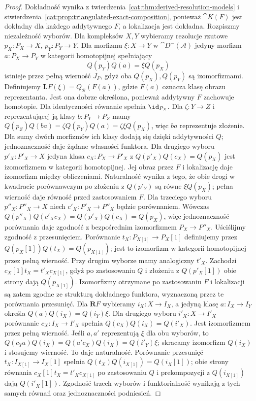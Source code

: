 \begin{proof}
Dokładność wynika z twierdzenia~\ref{cat:thm:derived-resolution-models} i stwierdzenia~\ref{cat:prop:triangulated-exact-composition}, ponieważ $\cat K(F)$ jest dokładny dla każdego addytywnego $F$, a lokalizacja jest dokładna. Rozpiszmy niezależność wyborów. Dla kompleksów $X,Y$ wybieramy rezolucje rzutowe $p_X:P_X\to X$, $p_Y:P_Y\to Y$. Dla morfizmu $\xi:X\to Y$ w $\cat D^-(\mathcal A)$ jedyny morfizm $a:P_X\to P_Y$ w kategorii homotopijnej spełniający
\[
 Q(p_Y)Q(a)=\xi Q(p_X)
\]
istnieje przez pełną wierność $J_P$, gdyż oba $Q(p_X),Q(p_Y)$ są izomorfizmami. Definiujemy $\mathbf L F(\xi)=Q_{\mathcal B}(F(a))$, gdzie $F(a)$ oznacza klasę obrazu reprezentanta. Jest ona dobrze określona, ponieważ addytywny $F$ zachowuje homotopie. Dla identyczności równanie spełnia $\id_{P_X}$. Dla $\zeta:Y\to Z$ i reprezentującej ją klasy $b:P_Y\to P_Z$ mamy $Q(p_Z)Q(ba)=\zeta Q(p_Y)Q(a)=\zeta\xi Q(p_X)$, więc $ba$ reprezentuje złożenie. Dla sumy dwóch morfizmów ich klasy dodają się dzięki addytywności $Q$; jednoznaczność daje żądane własności funktora. Dla drugiego wyboru $p'_X:P'_X\to X$ jedyna klasa $c_X:P_X\to P'_X$ z $Q(p'_X)Q(c_X)=Q(p_X)$ jest izomorfizmem w kategorii homotopijnej. Jej obraz przez $F$ i lokalizację daje izomorfizm między obliczeniami. Naturalność wynika z tego, że obie drogi w kwadracie porównawczym po złożeniu z $Q(p'_Y)$ są równe $\xi Q(p_X)$; pełna wierność daje równość przed zastosowaniem $F$. Dla trzeciego wyboru $p''_X:P''_X\to X$ niech $c'_X:P'_X\to P''_X$ będzie porównaniem. Wówczas $Q(p''_X)Q(c'_Xc_X)=Q(p'_X)Q(c_X)=Q(p_X)$, więc jednoznaczność porównania daje zgodność z bezpośrednim izomorfizmem $P_X\to P''_X$. Uściślijmy zgodność z przesunięciem. Porównanie $t_X:P_{X[1]}\to P_X[1]$ definiujemy przez $Q(p_X[1])Q(t_X)=Q(p_{X[1]})$; jest to izomorfizm w kategorii homotopijnej przez pełną wierność. Przy drugim wyborze mamy analogiczny $t'_X$. Zachodzi $c_X[1]t_X=t'_Xc_{X[1]}$, gdyż po zastosowaniu $Q$ i złożeniu z $Q(p'_X[1])$ obie strony dają $Q(p_{X[1]})$. Izomorfizmy otrzymane po zastosowaniu $F$ i lokalizacji są zatem zgodne ze strukturą dokładnego funktora, wyznaczoną przez te porównania przesunięć. Dla $\mathbf R F$ wybieramy $i_X:X\to I_X$, a jedyną klasę $a:I_X\to I_Y$ określa $Q(a)Q(i_X)=Q(i_Y)\xi$. Dla drugiego wyboru $i'_X:X\to I'_X$ porównanie $c_X:I_X\to I'_X$ spełnia $Q(c_X)Q(i_X)=Q(i'_X)$. Jest izomorfizmem przez pełną wierność. Jeśli $a,a'$ reprezentują $\xi$ dla obu wyborów, to $Q(c_Ya)Q(i_X)=Q(a'c_X)Q(i_X)=Q(i'_Y)\xi$; skracamy izomorfizm $Q(i_X)$ i stosujemy wierność. To daje naturalność. Porównanie przesunięć $t_X:I_{X[1]}\to I_X[1]$ spełnia $Q(t_X)Q(i_{X[1]})=Q(i_X[1])$; obie strony równania $c_X[1]t_X=t'_Xc_{X[1]}$ po zastosowaniu $Q$ i prekompozycji z $Q(i_{X[1]})$ dają $Q(i'_X[1])$. Zgodność trzech wyborów i funktorialność wynikają z tych samych równań oraz jednoznaczności podniesień.


\end{proof}
